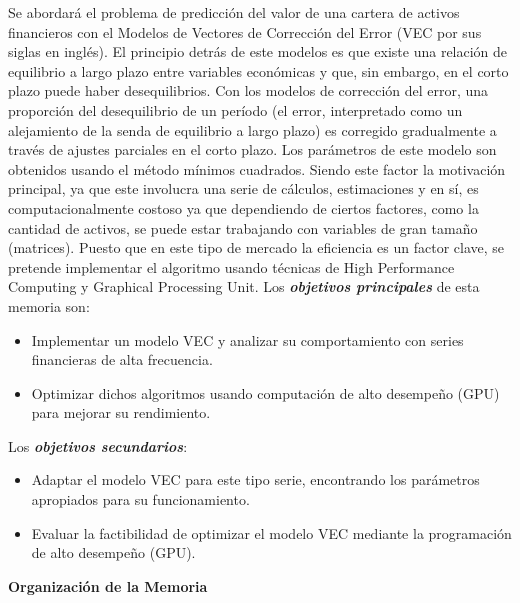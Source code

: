 Se abordará el problema de predicción del valor de una cartera de activos
financieros con el Modelos de Vectores de Corrección del Error (VEC por sus
siglas en inglés). El principio detrás de este modelos es que existe una
relación de equilibrio a largo plazo entre variables económicas y que, sin
embargo, en el corto plazo puede haber desequilibrios. Con los modelos de
corrección del error, una proporción del desequilibrio de un período (el error,
interpretado como un alejamiento de la senda de equilibrio a largo plazo) es
corregido gradualmente a través de ajustes parciales en el corto plazo.  Los
parámetros de este modelo son obtenidos usando el método mínimos cuadrados.
Siendo este factor la motivación principal, ya que este involucra una serie de
cálculos, estimaciones y en sí, es computacionalmente costoso ya que
dependiendo de ciertos factores, como la cantidad de activos, se puede estar
trabajando con variables de gran tamaño (matrices). Puesto que en este tipo de
mercado la eficiencia es un factor clave, se pretende implementar el algoritmo
usando técnicas de High Performance Computing y Graphical Processing Unit.
\newpage
\noindent Los \emph{\textbf{objetivos principales}} de esta memoria son:
\begin{itemize}
 \item Implementar un modelo VEC y analizar su comportamiento con
series financieras de alta frecuencia.
 \item Optimizar dichos algoritmos usando computación de alto desempeño
(GPU) para mejorar su rendimiento.
\end{itemize} 

\noindent Los \emph{\textbf{objetivos secundarios}}:
\begin{itemize}
	\item Adaptar el modelo VEC para este tipo serie, encontrando
los parámetros apropiados para su funcionamiento.
	\item Evaluar la factibilidad de optimizar el modelo VEC mediante la
programación de alto desempeño (GPU).
\end{itemize}


\noindent \textbf{Organización de la Memoria}


